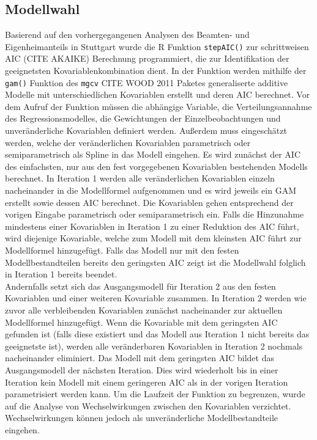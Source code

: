 \documentclass{Vorlage}
\begin{document}
\subsection{Modellwahl}
Basierend auf den vorhergegangenen Analysen des Beamten- und Eigenheimanteils in Stuttgart wurde die R Funktion \texttt{stepAIC()} zur schrittweisen AIC (CITE AKAIKE) Berechnung programmiert, die zur Identifikation der geeignetsten Kovariablenkombination dient. In der Funktion werden mithilfe der \texttt{gam()} Funktion des \texttt{mgcv} CITE WOOD 2011 Paketes generaliserte additive Modelle mit unterschiedlichen Kovariablen erstellt und deren AIC berechnet. Vor dem Aufruf der Funktion müssen die abhängige Variable, die Verteilungsannahme des Regressionsmodelles, die Gewichtungen der Einzelbeobachtungen und unveränderliche Kovariablen definiert werden. Außerdem muss eingeschätzt werden, welche der veränderlichen Kovariablen parametrisch oder semiparametrisch als Spline in das Modell eingehen. Es wird zunächst der AIC des einfachsten, nur aus den fest vorgegebenen Kovariablen bestehenden Modells berechnet. In Iteration 1 werden alle veränderlichen Kovariablen einzeln nacheinander in die Modellformel aufgenommen und es wird jeweils ein GAM erstellt sowie dessen AIC berechnet. Die Kovariablen gehen entsprechend der vorigen Eingabe parametrisch oder semiparametrisch ein. Falls die Hinzunahme mindestens einer Kovariablen in Iteration 1 zu einer Reduktion des AIC führt, wird diejenige Kovariable, welche zum Modell mit dem kleinsten AIC führt zur Modellformel hinzugefügt. Falls das Modell nur mit den festen Modellbestandteilen bereits den geringsten AIC zeigt ist die Modellwahl folglich in Iteration 1 bereits beendet.\\ Andernfalls setzt sich das Ausgangsmodell für Iteration 2 aus den festen Kovariablen und einer weiteren Kovariable zusammen. In Iteration 2 werden wie zuvor alle verbleibenden Kovariablen zunächst nacheinander zur aktuellen Modellformel hinzugefügt. Wenn die Kovariable mit dem geringsten AIC gefunden ist (falls diese existiert und das Modell aus Iteration 1 nicht bereits das geeignetste ist), werden alle veränderbaren Kovariablen in Iteration 2 nochmals nacheinander eliminiert. Das Modell mit dem geringsten AIC bildet das Ausgangsmodell der nächsten Iteration. Dies wird wiederholt bis in einer Iteration kein Modell mit einem geringeren AIC als in der vorigen Iteration parametrisiert werden kann. Um die Laufzeit der Funktion zu begrenzen, wurde auf die Analyse von Wechselwirkungen zwischen den Kovariablen verzichtet. Wechselwirkungen können jedoch als unveränderliche Modellbestandteile eingehen.
\end{document}
